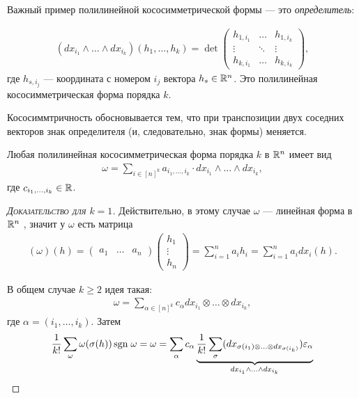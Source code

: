 \begin{exmpl}
 Важный пример полилинейной кососимметрической формы --- это \textit{определитель}:

 
\begin{align*}
 \left( dx_{i_1} \land \ldots \land dx_{i_k} \right)(h_1, \ldots, h_k) = \det \begin{pmatrix}
  h_{1,i_1} & \ldots & h_{1,i_k} \\
  \vdots & \ddots & \vdots \\
  h_{k,i_{1}} & \ldots & h_{k,i_k}
 \end{pmatrix},
\end{align*} где $h_{s,i_j}$ --- координата с номером $i_j$ вектора $h_s \in \mathbb{R}^{n}$. Это полилинейная кососимметрическая форма порядка $k$.

Кососиммтричность обосновывается тем, что при транспозиции двух соседних векторов знак определителя (и, следовательно, знак формы) меняется.

\end{exmpl}
\begin{thm}[%
из алгебры]
\label{theoream:determinant_is_only_polylinear_antisymmetric_form}
 Любая полилинейная кососимметрическая форма порядка $k$ в $\mathbb{R}^{n}$ имеет вид
 \begin{align*}
  \omega = \sum_{i \in [n]^{k}} a_{i_1,\ldots,i_k} \cdot dx_{i_1} \land \ldots \land dx_{i_k}
 ,\end{align*} где $c_{i_1,\ldots,i_k} \in \mathbb{R}$.
\end{thm}
\begin{proof}[\normalfont\textsc{Доказательство для $k=1$}]
 Действительно, в этому случае $\omega$ --- линейная форма в  $\mathbb{R}^{n}$ , значит у $\omega$  есть матрица
 \begin{align*}
  (\omega)(h) = \begin{pmatrix}
   a_1 & \ldots & a_n
  \end{pmatrix} \begin{pmatrix}
   h_1 \\
   \vdots \\
   h_n
  \end{pmatrix} = \sum_{i=1}^{n} a_i h_i = \sum_{i=1}^{n} a_i dx_i(h)
 .\end{align*}

 В общем случае $k \geqslant 2$ идея такая:
 \begin{align*}
  \omega = \sum_{\alpha \in [n]^{k}} c_{\alpha} dx_{i_1} \otimes \ldots \otimes dx_{i_k}
 ,\end{align*}  где $\alpha = (i_1, \ldots, i_k)$. Затем
 \begin{align*}
  \frac{1}{k!} \sum_{\omega} \omega(\sigma(h)) \,\mathrm{sgn}\;\omega = \omega = \sum_{\alpha} c_{\alpha} \underbrace{\frac{1}{k!} \sum_{\sigma} (dx_{\sigma(i_1) \otimes \ldots \otimes dx_{\sigma(i_k)}})\varepsilon_{\alpha}}_{dx_{i_1} \land \ldots \land dx_{i_k}}
 \end{align*} 
\end{proof}
